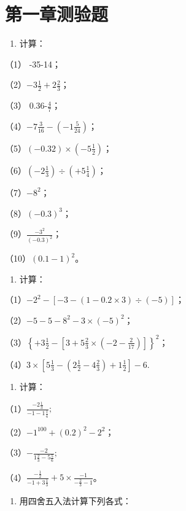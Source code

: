 \section{第一章测验题}

\begin{enumerate}
\item
  计算：
\end{enumerate}

（1） -35-14；

（2）\(-3\frac{1}{2} + 2\frac{2}{3}\)；

（3） 0.36-\(\frac{4}{7}\)；

（4）\(-7\frac{3}{16} - \left(-1\frac{5}{24}\right)\)；

（5）\((-0.32) \times \left(-5\frac{1}{2}\right)\)；

（6）\(\left(-2\frac{1}{3}\right) \div \left(+5\frac{1}{4}\right)\)；

（7）\(-8^{2}\)；

（8）\((-0.3)^{3}\)；

（9）\(\frac{-3^2}{(-0.3)^2}\)；

（10）\((0.1 - 1)^2\)。

\begin{enumerate}[start=2]
\item
  计算：
\end{enumerate}

（1）\(-2^{2} - [-3 - (1 - 0.2 \times 3) \div (-5)]\)；

（2）\(-5 - 5 - 8^{2} - 3 \times (-5)^{2}\)；

（3）\(\left\{ +3\frac{1}{2} - \left[3 + 5\frac{2}{3} \times \left(-2 - \frac{2}{17}\right)\right] \right\}^2\)；

（4）\(3 \times \left[5\frac{1}{3} - \left(2\frac{1}{2} - 4\frac{2}{3}\right) + 1\frac{1}{2}\right] - 6.\)

\begin{enumerate}[start=3]
\item
  计算：
\end{enumerate}

（1）\(\frac{-2\frac{1}{3}}{-1 - 1\frac{1}{4}};\)

（2）\(-1^{100} + (0.2)^{2} - 2^{2}\)；

（3）\(-\frac{-2}{1\frac{2}{3} - 5\frac{5}{6}};\)

（4）\(\frac{-\frac{1}{2}}{-1 + 3\frac{1}{3}} + 5 \times \frac{-1}{-\frac{2}{3} - 1}\)。

\begin{enumerate}[start=4]
\item
  用四舍五入法计算下列各式：
\end{enumerate}

